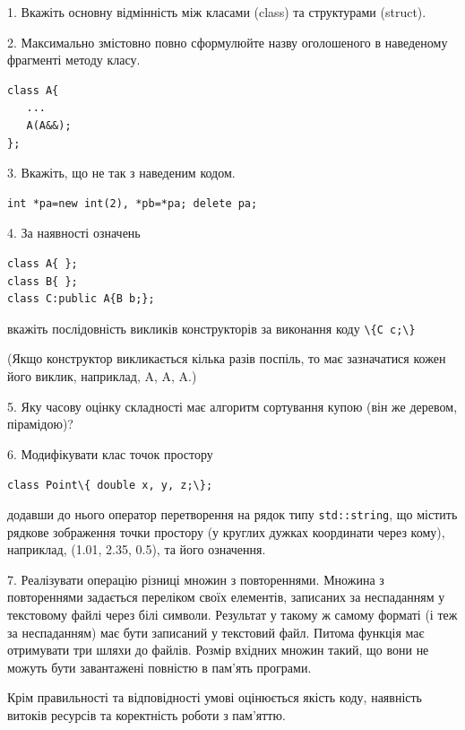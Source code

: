 \documentclass[12pt, ukrainian]{article}
\def\code#1{\Verb!#1!}
\begin{document}
{%
1. Вкажіть основну відмінність між класами (class) та структурами (struct).%
\par
\vspace{2mm}
2. Максимально змістовно повно сформулюйте назву оголошеного в наведеному фрагменті методу класу.
\vspace{-3mm}
\begin{verbatim}class A{
   ...
   A(A&&);
};\end{verbatim}
\vspace{-3mm}
\par
\vspace{2mm}
3. Вкажіть, що не так з наведеним кодом.
\vspace{-3mm}
\begin{verbatim}int *pa=new int(2), *pb=*pa; delete pa;\end{verbatim}
\vspace{-3mm}
\par
\vspace{2mm}
4. За наявності означень
\vspace{-3mm}
\begin{verbatim}
class A{ };
class B{ };
class C:public A{B b;};\end{verbatim}
\vspace{-3mm}
вкажіть послідовність викликів конструкторів за виконання коду \code{\{C c;\}} 

(Якщо конструктор викликається кілька разів поспіль, то має зазначатися кожен його виклик, наприклад, A, A, A.)

\vspace{2mm}
5. Яку часову оцінку складності має алгоритм сортування купою (він же деревом, пірамідою)?
\par
\vspace{2mm}
6. Модифікувати клас точок простору 

\qquad\code{class Point\{ double x, y, z;\};}


додавши до нього оператор перетворення на рядок типу \code{std::string}, що містить рядкове зображення точки простору (у круглих дужках координати через кому), наприклад, (1.01, 2.35, 0.5), та його означення.%
\par
\vspace{2mm}
7. 
Реалізувати операцію різниці множин з повтореннями. Множина з повтореннями задається переліком своїх елементів, записаних за неспаданням у текстовому файлі через білі символи. Результат у такому ж самому форматі (і теж за неспаданням) має бути записаний у текстовий файл. Питома функція має отримувати три шляхи до файлів. Розмір вхідних множин такий, що вони не можуть бути завантажені повністю в пам’ять програми.

Крім правильності та відповідності умові оцінюється якість коду, наявність витоків ресурсів та коректність роботи з пам'яттю. 

}
\end{document}
